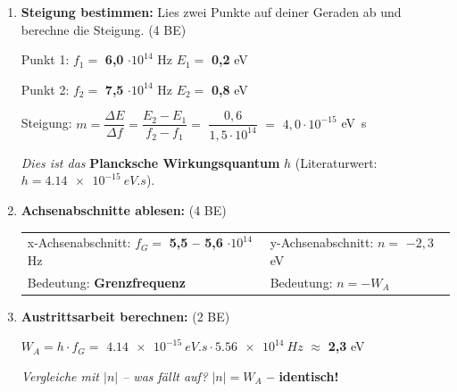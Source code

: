 \documentclass[11pt,a4paper]{article}
\newcommand{\lsg}[1]{\textcolor{loesung}{\textbf{#1}}}
\begin{document}
\begin{enumerate}[label=\alph*)]
\item \textbf{Steigung bestimmen:} Lies zwei Punkte auf deiner Geraden ab und berechne die Steigung. \hfill (4 BE)

\vspace{0.3em}
Punkt 1: $f_1 = $ \lsg{6,0} $\cdot 10^{14}$ Hz \quad $E_1 = $ \lsg{0,2} eV

Punkt 2: $f_2 = $ \lsg{7,5} $\cdot 10^{14}$ Hz \quad $E_2 = $ \lsg{0,8} eV

\vspace{0.5em}

Steigung: $m = \dfrac{\Delta E}{\Delta f} = \dfrac{E_2 - E_1}{f_2 - f_1} = $ \lsg{$\dfrac{0,6}{1,5 \cdot 10^{14}}$} $= $ \lsg{$4,0 \cdot 10^{-15}$} \si{eV.s}

\vspace{0.3em}
\textit{Dies ist das} \textbf{Plancksche Wirkungsquantum} $h$ (Literaturwert: $h = \SI{4,14e-15}{eV.s}$).

\vspace{0.6em}

\item \textbf{Achsenabschnitte ablesen:} \hfill (4 BE)

\begin{tabular}{@{}p{7cm}p{8cm}@{}}
x-Achsenabschnitt: $f_G = $ \lsg{5,5 -- 5,6} $\cdot 10^{14}$ Hz &
y-Achsenabschnitt: $n = $ \lsg{$-2,3$} eV \\[0.8em]
Bedeutung: \lsg{Grenzfrequenz} &
Bedeutung: \lsg{$n = -W_A$} \\
\end{tabular}

\vspace{0.6em}

\item \textbf{Austrittsarbeit berechnen:} \hfill (2 BE)

$W_A = h \cdot f_G = $ \lsg{$\SI{4,14e-15}{eV.s} \cdot \SI{5,56e14}{Hz}$} $\approx$ \lsg{2,3} eV

\vspace{0.3em}
\textit{Vergleiche mit $|n|$ -- was fällt auf?} \lsg{$|n| = W_A$ -- identisch!}

\end{enumerate}

\vspace{0.3em}

\end{document}
